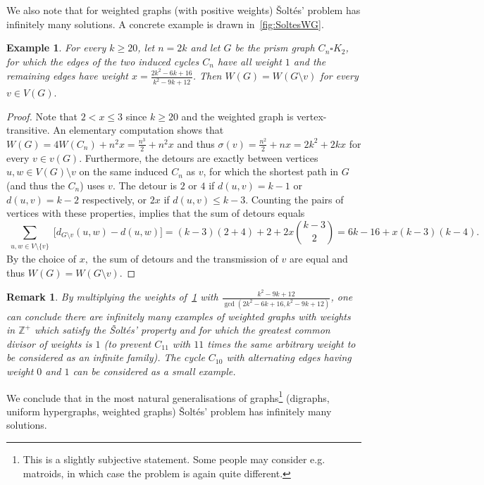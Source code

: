 \documentclass[a4paper,11pt]{article}
\newtheorem{exam}[defi]{Example}
\newtheorem{remark}[defi]{Remark}
\begin{document}
We also note that for weighted graphs (with positive weights) \v Solt\'es' problem has infinitely many solutions. 
A concrete example is drawn in~\cref{fig:SoltesWG}.

\begin{exam}\label{exam:weightedSG}
    For every $k \ge 20$, let $n=2k$ and let $G$ be the prism graph $C_n \square K_2$, for which the edges of the two induced cycles $C_n$ have all weight $1$ and the remaining edges have weight $x=\frac{2k^2-6k+16}{k^2-9k+12}$.
    Then $W(G)=W(G \setminus v)$ for every $v \in V(G).$
\end{exam}

\begin{proof}
    Note that $2<x\le 3$ since $k \ge 20$ and the weighted graph is vertex-transitive.
    An elementary computation shows that $W(G)=4W(C_n)+n^2x=\frac{n^3}{2}+n^2x$ and thus $\sigma(v)=\frac{n^2}{2}+nx=2k^2+2kx$ for every $v \in v(G).$
    Furthermore, the detours are exactly between vertices $u,w \in V(G) \setminus v$ on the same induced $C_n$ as $v$, for which the shortest path in $G$ (and thus the $C_n$) uses $v$. The detour is $2$ or $4$ if $d(u,v)=k-1$ or $d(u,v)=k-2$ respectively, or $2x$ if $d(u,v) \le k-3.$ 
    Counting the pairs of vertices with these properties, implies that the sum of detours equals
    $$\sum_{\substack{u, w \in V\setminus \{v\}}} \big[d_{G \setminus v}(u, w) - d(u, w)\big]=(k-3)(2+4)+2+2x\binom{k-3}{2}=6k-16+x(k-3)(k-4).$$
    By the choice of $x,$ the sum of detours and the transmission of $v$ are equal and thus $W(G)=W(G \setminus v)$.
\end{proof}

\begin{remark}
    By multiplying the weights of~\cref{exam:weightedSG} with $\frac{k^2-9k+12}{\gcd(2k^2-6k+16,k^2-9k+12)}$, one can conclude there are infinitely many examples of weighted graphs with weights in $\mathbb Z^+$ which satisfy the \v Solt\'es' property and for which the greatest common divisor of weights is $1$ (to prevent $C_{11}$ with $11$ times the same arbitrary weight to be considered as an infinite family).
    The cycle $C_{10}$ with alternating edges having weight $0$ and $1$ can be considered as a small example.
\end{remark}

We conclude that in the most natural generalisations of graphs\footnote{This is a slightly subjective statement. Some people may consider e.g. matroids, in which case the problem is again quite different.} (digraphs, uniform hypergraphs, weighted graphs) \v Solt\'es' problem has infinitely many solutions.
\end{document}
